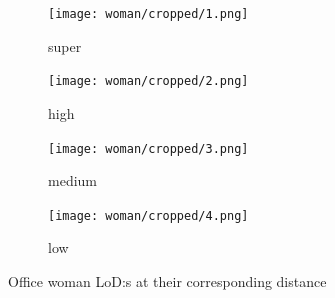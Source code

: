 \begin{figure}[ht]
  \centering
  \begin{subfigure}[b]{.22\textwidth}
    \texttt{[image: woman/cropped/1.png]}
    \caption{super}
    \label{fig:woman0}
  \end{subfigure}
  \begin{subfigure}[b]{.22\textwidth}
    \texttt{[image: woman/cropped/2.png]}
    \caption{high}
    \label{fig:woman1}
  \end{subfigure}
  \centering
  \begin{subfigure}[b]{.22\textwidth}
    \texttt{[image: woman/cropped/3.png]} 
    \caption{medium}
    \label{fig:woman2}
  \end{subfigure}
  \begin{subfigure}[b]{.22\textwidth}
    \texttt{[image: woman/cropped/4.png]}
    \caption{low}
    \label{fig:woman3}
  \end{subfigure}
  \caption{Office woman LoD:s at their corresponding distance} 
  \label{fig:woman_lod}
\end{figure}
